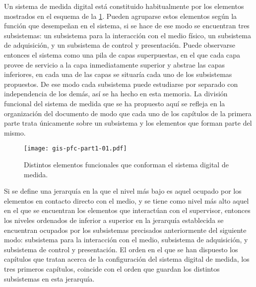 Un sistema de medida digital está constituido habitualmente por los
elementos mostrados en el esquema de la \cref{fig:digmeasstm}. Pueden
agruparse estos elementos según la función que desempeñan en el sistema, si
se hace de ese modo se encuentran tres subsistemas: un subsistema para la
interacción con el medio físico, un subsistema de adquisición, y un
subsistema de control y presentación. Puede observarse entonces el sistema
como una pila de capas superpuestas, en el que cada capa provee de servicio
a la capa inmediatamente superior y abstrae las capas inferiores, en cada
una de las capas se situaría cada uno de los subsistemas propuestos. De ese
modo cada subsistema puede estudiarse por separado con independencia de los
demás, así se ha hecho en esta memoria. La división funcional del sistema
de medida que se ha propuesto aquí se refleja en la organización del
documento de modo que cada uno de los capítulos de la primera parte trata
únicamente sobre un subsistema y los elementos que forman parte del mismo.

\begin{figure}
    \begin{center}
	\texttt{[image: gis-pfc-part1-01.pdf]}
    \end{center}
    \captionsetup{listformat=romanos, labelformat=romanos}
    \caption[Sistema de medida digital]{Distintos elementos funcionales
    que conforman el sistema digital de medida.}
    \label{fig:digmeasstm}
\end{figure}

\llongpage{}
Si se define una jerarquía en la que el nivel más bajo es aquel ocupado por
los elementos en contacto directo con el medio, y se tiene como nivel más
alto aquel en el que se encuentran los elementos que interactúan con el
supervisor, entonces los niveles ordenados de inferior a superior en la
jerarquía establecida se encuentran ocupados por los subsistemas precisados
anteriormente del siguiente modo: subsistema para la interacción con el
medio, subsistema de adquisición, y subsistema de control y presentación.
El orden en el que se han dispuesto los capítulos que tratan acerca de la
configuración del sistema digital de medida, los tres primeros capítulos,
coincide con el orden que guardan los distintos subsistemas en esta
jerarquía.
